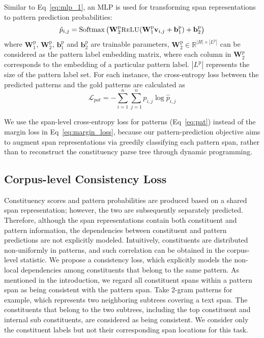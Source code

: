 \documentclass[11pt]{article}
\DeclareMathOperator*{\softmax}{Softmax}
\begin{document}
Similar to Eq~\ref{eq:mlp_1}, an MLP is used for transforming span representations to pattern prediction probabilities: 
\begin{equation}
\small
    \hat{p}_{i,j} = \softmax\big(\mathbf{W}^{\mathrm{p}}_2  \textsc{ReLU}(\mathbf{W}^{\mathrm{p}}_1 \mathbf{v}_{i,j} + \mathbf{b}^{\mathrm{p}}_1) + \mathbf{b}^{\mathrm{p}}_2\big)
\label{softmax}
\end{equation}
where $\mathbf{W}^{\mathrm{p}}_1$, $\mathbf{W}^{\mathrm{p}}_2$, $\mathbf{b}^{\mathrm{p}}_1$ and $\mathbf{b}^{\mathrm{p}}_2$ are trainable parameters,  $\mathbf{W}^{\mathrm{p}}_2 \in \mathbb{R}^{|H| \times |L^{\mathrm{p}}|}$ can be considered as the pattern label embedding matrix, where each column in $\mathbf{W}_2^p$ corresponds to the embedding of a particular pattern label. $|L^{\mathrm{p}}|$ represents the size of the pattern label set.
For each instance, the cross-entropy loss between the predicted patterns and the gold patterns are calculated as
\begin{equation}
   \mathcal{L}_{pat} = - \sum_{i=1}^n \sum_{j=1}^n p_{i,j} \log \hat{p}_{i,j}
\label{eq:pat}
\end{equation}

We use the span-level cross-entropy loss for patterns (Eq~\ref{eq:pat}) instead of the margin loss in Eq~\ref{eq:margin_loss}, because our pattern-prediction objective aims to augment span representations via greedily classifying each pattern span, rather than to reconstruct the constituency parse tree through dynamic programming. 


\subsection{Corpus-level Consistency Loss}
\label{sec:consistency_loss}
Constituency scores and pattern probabilities are produced based on a shared span representation; however, the two are subsequently separately predicted. 
Therefore, although the span representations contain both constituent and pattern information, the dependencies between constituent and pattern predictions are not explicitly modeled. 
Intuitively, constituents are distributed non-uniformly in patterns, and such correlation can be obtained in the corpus-level statistic. We propose a consistency loss, which explicitly models the non-local dependencies among constituents that belong to the same pattern. As mentioned in the introduction, we regard all constituent spans within a pattern span as being consistent with the pattern span. Take 2-gram patterns for example, which represents two neighboring subtrees covering a text span. The constituents that belong to the two subtrees, including the top constituent and internal sub constituents, are considered as being consistent. We consider only the constituent labels but not their corresponding span locations for this task.
\end{document}
